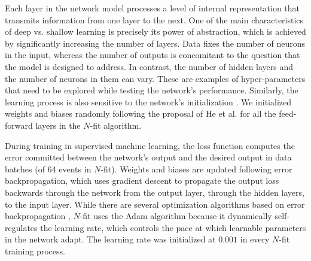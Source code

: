 

Each layer in the network model processes a level of internal representation that transmits information from one layer to the next. One of the main characteristics of deep vs. shallow learning is precisely its power of abstraction, which is achieved by significantly increasing the number of layers. Data fixes the number of neurons in the input, whereas the number of outputs is concomitant to the question that the model is designed to address. In contrast, the number of hidden layers and the number of neurons in them can vary. These are examples of hyper-parameters that need to be explored while testing the network's performance. Similarly, the learning process is also sensitive to the network's initialization \cite{ini_weights}. We initialized weights and biases randomly following the proposal of He et al. \cite{He} for all the feed-forward layers in the $N$-fit algorithm.

During training in supervised machine learning, the loss function computes the error committed between the network's output and the desired output in data batches (of 64 events in $N$-fit). Weights and biases are updated following error backpropagation, which uses gradient descent to propagate the output loss backwards through the network from the output layer, through the hidden layers, to the input layer. While there are several optimization algorithms based on error backpropagation \cite{SGD}, $N$-fit uses the Adam algorithm \cite{Adam} because it dynamically self-regulates the learning rate, which controls the pace at which learnable parameters in the network adapt. The learning rate was initialized at $0.001$ in every $N$-fit training process.

